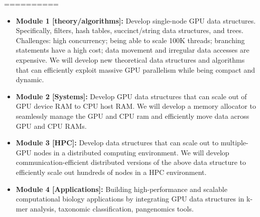 






\iffalse
==========



\begin{itemize}[noitemsep, leftmargin=*]
  \item {\bf Module 1 [theory/algorithms]:} Develop single-node GPU data structures.
    Specifically, filters, hash tables, succinct/string data structures, and
    trees. Challenges: high concurrency; being able to scale 100K threads;
    branching statements have a high cost; data movement and irregular data
    accesses are expensive. We will develop new theoretical data structures and
    algorithms that can efficiently exploit massive GPU parallelism while being
    compact and dynamic.

  \item {\bf Module 2 [Systems]:} Develop GPU data structures that can scale out of
      GPU device RAM to CPU host RAM. We will develop a memory allocator to
      seamlessly manage the GPU and CPU ram and efficiently move data across GPU
      and CPU RAMs.

    \item {\bf Module 3 [HPC]:} Develop data structures that can scale out to
      multiple-GPU nodes in a distributed computing environment. We will develop
      communication-efficient distributed versions of the above data structure
      to efficiently scale out hundreds of nodes in a HPC environment.

    \item {\bf Module 4 [Applications]:} Building high-performance and scalable
      computational biology applications by integrating GPU data structures in
      k-mer analysis, taxonomic classification, pangenomics tools.

\end{itemize}

